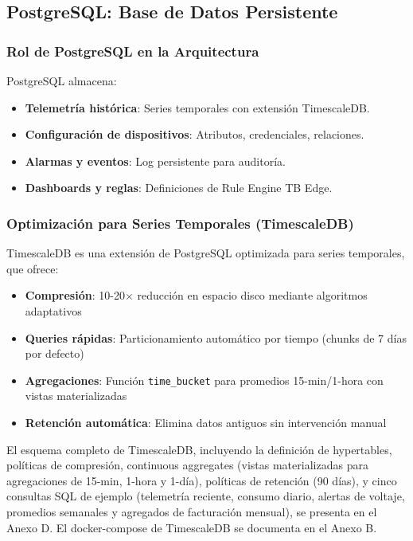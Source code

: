 \subsection{PostgreSQL: Base de Datos Persistente}

\subsubsection{Rol de PostgreSQL en la Arquitectura}

PostgreSQL almacena:
\begin{itemize}
    \item \textbf{Telemetría histórica}: Series temporales con extensión TimescaleDB.
    \item \textbf{Configuración de dispositivos}: Atributos, credenciales, relaciones.
    \item \textbf{Alarmas y eventos}: Log persistente para auditoría.
    \item \textbf{Dashboards y reglas}: Definiciones de Rule Engine TB Edge.
\end{itemize}

\subsubsection{Optimización para Series Temporales (TimescaleDB)}

TimescaleDB es una extensión de PostgreSQL optimizada para series temporales, que ofrece:

\begin{itemize}
    \item \textbf{Compresión}: 10-20$\times$ reducción en espacio disco mediante algoritmos adaptativos
    \item \textbf{Queries rápidas}: Particionamiento automático por tiempo (chunks de 7 días por defecto)
    \item \textbf{Agregaciones}: Función \texttt{time\_bucket} para promedios 15-min/1-hora con vistas materializadas
    \item \textbf{Retención automática}: Elimina datos antiguos sin intervención manual
\end{itemize}

El esquema completo de TimescaleDB, incluyendo la definición de hypertables, políticas de compresión, continuous aggregates (vistas materializadas para agregaciones de 15-min, 1-hora y 1-día), políticas de retención (90 días), y cinco consultas SQL de ejemplo (telemetría reciente, consumo diario, alertas de voltaje, promedios semanales y agregados de facturación mensual), se presenta en el Anexo D. El docker-compose de TimescaleDB se documenta en el Anexo B.


